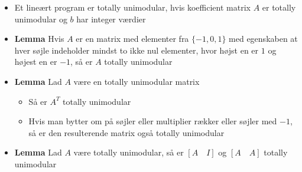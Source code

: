 \begin{itemize}
\begin{proof}
  \end{proof}
  \item Et lineært program er totally unimodular, hvis koefficient matrix $A$ er totally unimodular og $b$ har integer værdier
  \item \textbf{Lemma} Hvis $A$ er en matrix med elementer fra $\{-1,0,1\}$ med egenskaben at hver søjle indeholder mindst to ikke nul elementer, hvor højst en er $1$ og højest en er $-1$, så er $A$ totally unimodular
  \item \textbf{Lemma} Lad $A$ være en totally unimodular matrix
  \begin{itemize}
  	\item Så er $A^T$ totally unimodular
    \item Hvis man bytter om på søjler eller multiplier rækker eller søjler med $-1$, så er den resulterende matrix også totally unimodular
  \end{itemize} 
  \item \textbf{Lemma} Lad $A$ være totally unimodular, så er $[A \quad I]$ og $[A \quad A]$ totally unimodular
\end{itemize}

